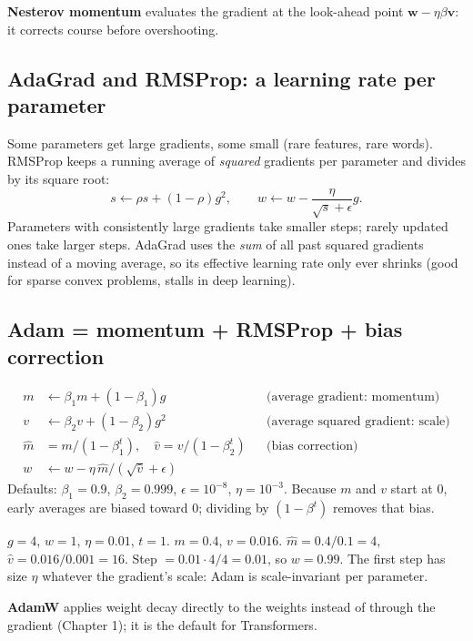 \textbf{Nesterov momentum} evaluates the gradient at the look-ahead point $\mathbf w - \eta\beta\mathbf v$: it corrects course
before overshooting.

\subsection{AdaGrad and RMSProp: a learning rate per parameter}
Some parameters get large gradients, some small (rare features, rare words). RMSProp keeps a running average of
\emph{squared} gradients per parameter and divides by its square root:
\[ s \leftarrow \rho s + (1-\rho)g^2,\qquad w \leftarrow w - \frac{\eta}{\sqrt{s} + \epsilon}g. \]
Parameters with consistently large gradients take smaller steps; rarely updated ones take larger steps. AdaGrad uses the
\emph{sum} of all past squared gradients instead of a moving average, so its effective learning rate only ever shrinks
(good for sparse convex problems, stalls in deep learning).

\subsection{Adam = momentum + RMSProp + bias correction}
\begin{align*}
m &\leftarrow \beta_1m + (1-\beta_1)g &&\text{(average gradient: momentum)}\\
v &\leftarrow \beta_2v + (1-\beta_2)g^2 &&\text{(average squared gradient: scale)}\\
\hat m &= m/(1-\beta_1^t),\quad \hat v = v/(1-\beta_2^t) &&\text{(bias correction)}\\
w &\leftarrow w - \eta\,\hat m/(\sqrt{\hat v} + \epsilon)
\end{align*}
Defaults: $\beta_1 = 0.9$, $\beta_2 = 0.999$, $\epsilon = 10^{-8}$, $\eta = 10^{-3}$. Because $m$ and $v$ start at 0, early
averages are biased toward 0; dividing by $(1 - \beta^t)$ removes that bias.

\begin{example}
$g = 4$, $w = 1$, $\eta = 0.01$, $t = 1$. $m = 0.4$, $v = 0.016$. $\hat m = 0.4/0.1 = 4$, $\hat v = 0.016/0.001 = 16$.
Step $= 0.01\cdot4/4 = 0.01$, so $w = 0.99$. The first step has size $\eta$ whatever the gradient's scale: Adam is
scale-invariant per parameter.
\end{example}

\textbf{AdamW} applies weight decay directly to the weights instead of through the gradient (Chapter 1); it is the
default for Transformers.

